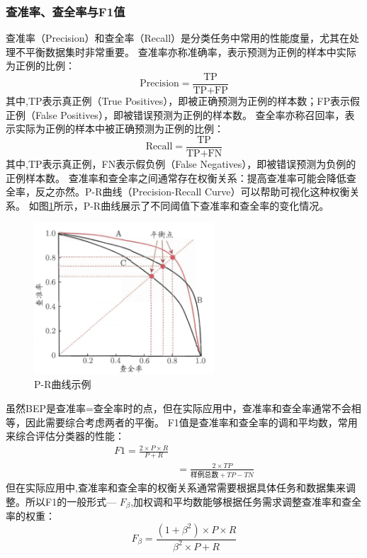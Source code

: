 \subsubsection{查准率、查全率与F1值}
查准率（Precision）和查全率（Recall）是分类任务中常用的性能度量，尤其在处理不平衡数据集时非常重要。
查准率亦称准确率，表示预测为正例的样本中实际为正例的比例：
\begin{equation}
    \text{Precision} = \frac{\text{TP}}{\text{TP} + \text{FP}}  
\end{equation}
其中,TP表示真正例（True Positives），即被正确预测为正例的样本数；FP表示假正例（False Positives），即被错误预测为正例的样本数。
查全率亦称召回率，表示实际为正例的样本中被正确预测为正例的比例：
\begin{equation}
    \text{Recall} = \frac{\text{TP}}{\text{TP} + \text{FN}}
\end{equation}
其中,TP表示真正例，FN表示假负例（False Negatives），即被错误预测为负例的正例样本数。
查准率和查全率之间通常存在权衡关系：提高查准率可能会降低查全率，反之亦然。P-R曲线（Precision-Recall Curve）可以帮助可视化这种权衡关系。
如图\ref{fig:pr_curve}所示，P-R曲线展示了不同阈值下查准率和查全率的变化情况。
\begin{figure}[H]
    \centering
    \includegraphics[width=0.6\textwidth]{static/images/P-R曲线图.png}
    \caption{P-R曲线示例}
    \label{fig:pr_curve}
\end{figure}
虽然BEP是查准率=查全率时的点，但在实际应用中，查准率和查全率通常不会相等，因此需要综合考虑两者的平衡。
F1值是查准率和查全率的调和平均数，常用来综合评估分类器的性能：
\begin{align}
    F1=\frac{2 \times P \times R}{P+R} \nonumber \\
    &= \frac{2 \times TP}{\text{样例总数}+TP-TN}
\end{align}
但在实际应用中,查准率和查全率的权衡关系通常需要根据具体任务和数据集来调整。所以F1的一般形式--- $F_\beta$,加权调和平均数能够根据任务需求调整查准率和查全率的权重：
\begin{equation}
    F_\beta = \frac{(1+\beta^2) \times P \times R}{\beta^2 \times P + R}
\end{equation}

